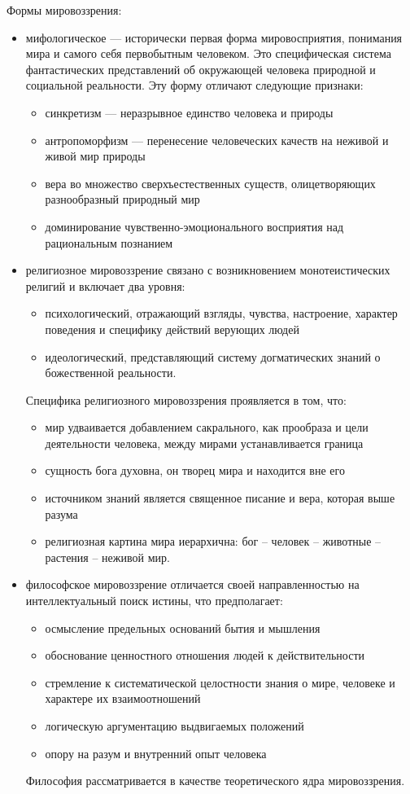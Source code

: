 Формы мировоззрения:
\begin{itemize}
	\item мифологическое --- исторически первая форма мировосприятия, понимания мира и самого себя первобытным человеком. Это специфическая система фантастических представлений об окружающей человека природной и социальной реальности. Эту форму отличают следующие признаки:
	\begin{itemize}
		\item синкретизм ---  неразрывное единство человека и природы
		\item антропоморфизм --- перенесение человеческих качеств на неживой и живой мир природы
		\item вера во множество сверхъестественных существ, олицетворяющих разнообразный природный мир
		\item доминирование чувственно-эмоционального восприятия над рациональным познанием
	\end{itemize}
	\item религиозное мировоззрение связано с возникновением монотеистических религий и включает два уровня:
	\begin{itemize}
		\item психологический, отражающий взгляды, чувства, настроение, характер поведения и специфику действий верующих людей
		\item идеологический, представляющий систему догматических знаний о божественной реальности.
	\end{itemize}
	Специфика религиозного мировоззрения проявляется в том, что:
	\begin{itemize}
		\item мир удваивается добавлением сакрального, как прообраза и цели деятельности человека, между мирами устанавливается граница
		\item сущность бога духовна, он творец мира и находится вне его
		\item источником знаний является священное писание и вера, которая выше разума
		\item религиозная картина мира иерархична: бог -- человек -- животные -- растения -- неживой мир.
	\end{itemize}
	\item философское мировоззрение отличается своей направленностью на интеллектуальный поиск истины, что предполагает:
	\begin{itemize}
		\item осмысление предельных оснований бытия и мышления
		\item обоснование ценностного отношения людей к действительности
		\item стремление к систематической целостности знания о мире, человеке и характере их взаимоотношений
		\item логическую аргументацию выдвигаемых положений
		\item опору на разум и внутренний опыт человека
	\end{itemize}
	Философия рассматривается в качестве теоретического ядра мировоззрения.
\end{itemize}
